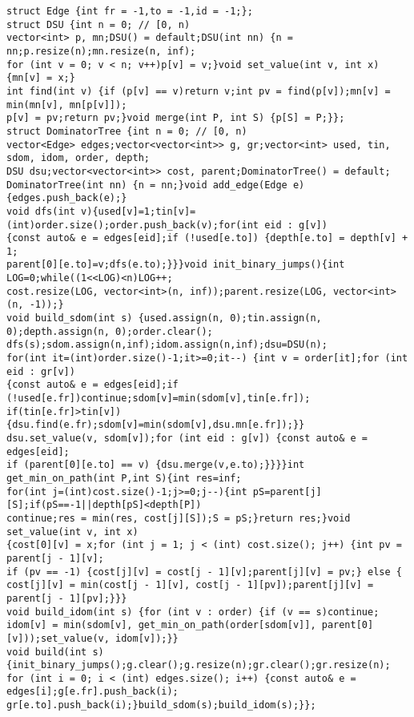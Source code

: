 \documentclass[12pt]{article}
\begin{document}
\begin{verbatim}
struct Edge {int fr = -1,to = -1,id = -1;};
struct DSU {int n = 0; // [0, n)
vector<int> p, mn;DSU() = default;DSU(int nn) {n = nn;p.resize(n);mn.resize(n, inf);
for (int v = 0; v < n; v++)p[v] = v;}void set_value(int v, int x) {mn[v] = x;}
int find(int v) {if (p[v] == v)return v;int pv = find(p[v]);mn[v] = min(mn[v], mn[p[v]]);
p[v] = pv;return pv;}void merge(int P, int S) {p[S] = P;}};
struct DominatorTree {int n = 0; // [0, n)
vector<Edge> edges;vector<vector<int>> g, gr;vector<int> used, tin, sdom, idom, order, depth;
DSU dsu;vector<vector<int>> cost, parent;DominatorTree() = default;
DominatorTree(int nn) {n = nn;}void add_edge(Edge e) {edges.push_back(e);}
void dfs(int v){used[v]=1;tin[v]=(int)order.size();order.push_back(v);for(int eid : g[v]) 
{const auto& e = edges[eid];if (!used[e.to]) {depth[e.to] = depth[v] + 1;
parent[0][e.to]=v;dfs(e.to);}}}void init_binary_jumps(){int LOG=0;while((1<<LOG)<n)LOG++;
cost.resize(LOG, vector<int>(n, inf));parent.resize(LOG, vector<int>(n, -1));}
void build_sdom(int s) {used.assign(n, 0);tin.assign(n, 0);depth.assign(n, 0);order.clear();
dfs(s);sdom.assign(n,inf);idom.assign(n,inf);dsu=DSU(n);
for(int it=(int)order.size()-1;it>=0;it--) {int v = order[it];for (int eid : gr[v]) 
{const auto& e = edges[eid];if (!used[e.fr])continue;sdom[v]=min(sdom[v],tin[e.fr]);
if(tin[e.fr]>tin[v]){dsu.find(e.fr);sdom[v]=min(sdom[v],dsu.mn[e.fr]);}}
dsu.set_value(v, sdom[v]);for (int eid : g[v]) {const auto& e = edges[eid];
if (parent[0][e.to] == v) {dsu.merge(v,e.to);}}}}int get_min_on_path(int P,int S){int res=inf;
for(int j=(int)cost.size()-1;j>=0;j--){int pS=parent[j][S];if(pS==-1||depth[pS]<depth[P])
continue;res = min(res, cost[j][S]);S = pS;}return res;}void set_value(int v, int x) 
{cost[0][v] = x;for (int j = 1; j < (int) cost.size(); j++) {int pv = parent[j - 1][v];
if (pv == -1) {cost[j][v] = cost[j - 1][v];parent[j][v] = pv;} else {
cost[j][v] = min(cost[j - 1][v], cost[j - 1][pv]);parent[j][v] = parent[j - 1][pv];}}}
void build_idom(int s) {for (int v : order) {if (v == s)continue;
idom[v] = min(sdom[v], get_min_on_path(order[sdom[v]], parent[0][v]));set_value(v, idom[v]);}}
void build(int s) {init_binary_jumps();g.clear();g.resize(n);gr.clear();gr.resize(n);
for (int i = 0; i < (int) edges.size(); i++) {const auto& e = edges[i];g[e.fr].push_back(i);
gr[e.to].push_back(i);}build_sdom(s);build_idom(s);}};
\end{verbatim}
\end{document}
